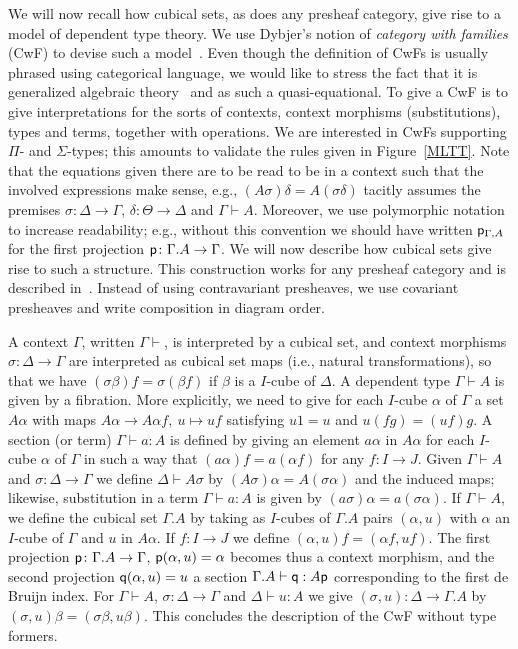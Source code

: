 \documentclass[10pt,a4paper]{article}
\newcommand{\pp}{{\sf p}}
\newcommand{\qq}{{\sf q}}
\begin{document}
We will now recall how cubical sets, as does any presheaf category,
give rise to a model of dependent type theory.  We use Dybjer's notion
of \emph{category with families} (CwF) to devise such a
model~\cite{Dybjer}.  Even though the definition of CwFs is usually
phrased using categorical language, we would like to stress the fact
that it is generalized algebraic theory~\cite{Cartmell} and as such a
quasi-equational.  To give a CwF is to give interpretations for the
sorts of contexts, context morphisms (substitutions), types and terms,
together with operations.  We are interested in CwFs supporting $\Pi$-
and $\Sigma$-types; this amounts to validate the rules given in
Figure~\ref{MLTT}.  Note that the equations given there are to be read
to be in a context such that the involved expressions make sense,
e.g., $(A \sigma) \delta = A (\sigma \delta)$ tacitly assumes the
premises $\sigma \colon \Delta \to \Gamma$, $\delta \colon \Theta \to
\Delta$ and $\Gamma \vdash A$.  Moreover, we use polymorphic notation
to increase readability; e.g., without this convention we should have
written $\pp_{\Gamma, A}$ for the first projection $\pp \colon
\Gamma.A \to \Gamma$.  We will now describe how cubical sets give rise
to such a structure.  This construction works for any presheaf
category and is described in~\cite[Sec.~4]{Hofmann}.  Instead of using
contravariant presheaves, we use covariant presheaves and write
composition in diagram order.

A context $\Gamma$, written $\Gamma \vdash$, is interpreted by a
cubical set, and context morphisms $\sigma:\Delta\to\Gamma$ are
interpreted as cubical set maps (i.e., natural transformations), so
that we have $(\sigma\beta)f = \sigma(\beta f)$ if $\beta$ is a
$I$-cube of $\Delta$.  A dependent type $\Gamma\vdash A$ is given by a
fibration.  More explicitly, we need to give for each $I$-cube
$\alpha$ of $\Gamma$ a set $A\alpha$ with maps $A\alpha\to A\alpha
f,~u\longmapsto uf$ satisfying $u1 = u$ and $u(fg) = (uf)g$.  A
section (or term) $\Gamma\vdash a:A$ is defined by giving an element
$a\alpha$ in $A\alpha$ for each $I$-cube $\alpha$ of $\Gamma$ in such
a way that $(a\alpha) f = a (\alpha f)$ for any $f \colon I \to J$.
Given $\Gamma \vdash A$ and $\sigma \colon \Delta \to \Gamma$ we
define $\Delta \vdash A \sigma$ by $(A \sigma) \alpha = A (\sigma
\alpha)$ and the induced maps; likewise, substitution in a term
$\Gamma \vdash a : A$ is given by $(a \sigma) \alpha = a (\sigma
\alpha)$.  If $\Gamma\vdash A$, we define the cubical set $\Gamma.A$
by taking as $I$-cubes of $\Gamma.A$ pairs $(\alpha,u)$ with $\alpha$
an $I$-cube of $\Gamma$ and $u$ in $A\alpha$. If $f:I\to J$ we define
$(\alpha,u)f = (\alpha f,u f)$.  The first projection $\pp \colon
\Gamma.A \to \Gamma$, $\pp (\alpha, u) = \alpha$ becomes thus a
context morphism, and the second projection $\qq (\alpha, u) = u$ a
section $\Gamma.A \vdash \qq : A \pp$ corresponding to the first de
Bruijn index.  For $\Gamma \vdash A$, $\sigma \colon \Delta \to
\Gamma$ and $\Delta \vdash u : A$ we give $(\sigma, u) \colon \Delta
\to \Gamma.A$ by $(\sigma, u) \beta = (\sigma \beta, u \beta)$.  This
concludes the description of the CwF without type formers.
\end{document}
